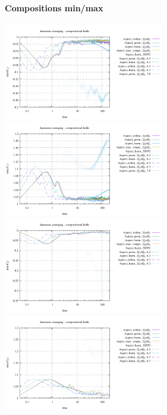 \paragraph{Compositions min/max}
\begin{center}
\includegraphics[width=7cm]{images/stokes_sphere_fs2D/C1_min}
\includegraphics[width=7cm]{images/stokes_sphere_fs2D/C1_max}\\
\includegraphics[width=7cm]{images/stokes_sphere_fs2D/C2_min}
\includegraphics[width=7cm]{images/stokes_sphere_fs2D/C2_max}
\end{center}



